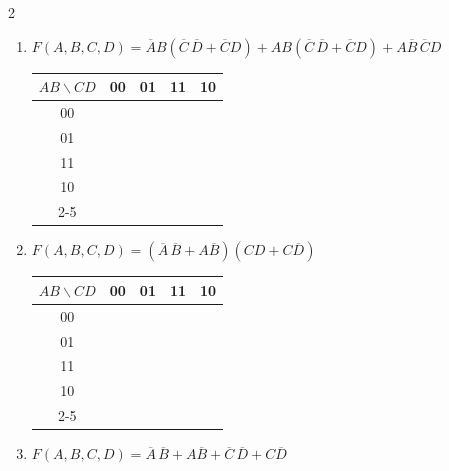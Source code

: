 \documentclass[12pt,a4paper]{article}
\begin{document}
\begin{multicols}{2}
\begin{enumerate}[label=\alph*)]
  \item \begin{minipage}[t]{\linewidth}
    {\footnotesize $F(A,B,C,D) = \overline{A}B(\overline{C}\,\overline{D} + \overline{C}D) + AB(\overline{C}\,\overline{D} + \overline{C}D) + A\overline{B}\,\overline{C}D$}

    \begin{center}
      \begin{tabular}{c|c|c|c|c|}
        $AB \backslash CD$ & 00 & 01 & 11 & \multicolumn{1}{c}{10} \\
        \hline
        00 & \phantom{0} & \phantom{0} & \phantom{0} & \phantom{0} \\
        \hline
        01 & \phantom{0} & \phantom{0} & \phantom{0} & \phantom{0} \\
        \hline
        11 & \phantom{0} & \phantom{0} & \phantom{0} & \phantom{0} \\
        \hline
        10 & \phantom{0} & \phantom{0} & \phantom{0} & \phantom{0} \\
        \cline{2-5}
      \end{tabular}
    \end{center}
  \end{minipage}

  \item \begin{minipage}[t]{\linewidth}
    {\small $F(A,B,C,D) = (\overline{A}\,\overline{B} + A\overline{B})(CD + C\overline{D})$}

    \begin{center}
      \begin{tabular}{c|c|c|c|c|}
        $AB \backslash CD$ & 00 & 01 & 11 & \multicolumn{1}{c}{10} \\
        \hline
        00 & \phantom{0} & \phantom{0} & \phantom{0} & \phantom{0} \\
        \hline
        01 & \phantom{0} & \phantom{0} & \phantom{0} & \phantom{0} \\
        \hline
        11 & \phantom{0} & \phantom{0} & \phantom{0} & \phantom{0} \\
        \hline
        10 & \phantom{0} & \phantom{0} & \phantom{0} & \phantom{0} \\
        \cline{2-5}
      \end{tabular}
    \end{center}
  \end{minipage}

  \item \begin{minipage}[t]{\linewidth}
    {\small $F(A,B,C,D) = \overline{A}\,\overline{B} + A\overline{B} + \overline{C}\,\overline{D} + C\overline{D}$}


\end{minipage}
\end{enumerate}
\end{multicols}
\end{document}
